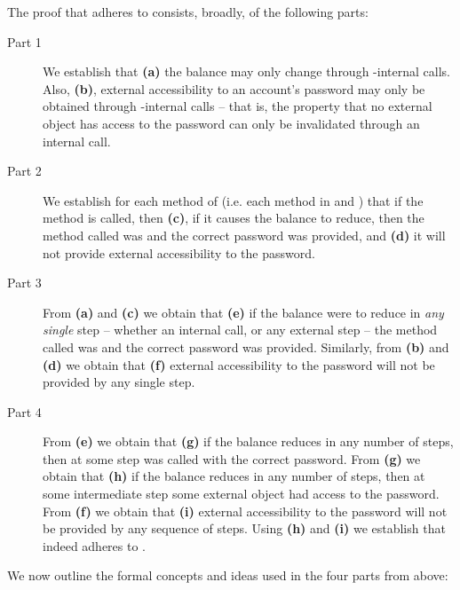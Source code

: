 The proof that  adheres to  consists,
broadly, of the following parts:


\begin{description}
\item[Part 1] We establish that  \textbf{(a)} the balance may only change through  
-internal calls.
Also,  \textbf{(b)},   external accessibility to an account's password may 
only be obtained through  -internal calls -- that is,  the property that
no external object has access to the password can only be invalidated through an internal call.
 
\item[Part 2] We establish  for each method of  (i.e. each method in  and ) that if the method is called, then 
 \textbf{(c)},  if it  causes the  balance to reduce, then the method called was
  and the correct password was provided, and 
  \textbf{(d)} it will not provide external accessibility to the password.

 \item[Part 3]  From \textbf{(a)}  and  \textbf{(c)} we obtain that \textbf{(e)}  if the balance were to 
reduce in \emph{any}  \emph{single} step -- whether an internal call, or any external step --
 the method called was
  and the correct password was provided. Similarly,   from
 \textbf{(b)}  and  \textbf{(d)} we obtain that \textbf{(f)}
 external accessibility to the password will not be provided by any single step.
    
 
\item[Part 4] From \textbf{(e)} we obtain that  \textbf{(g)}   if the balance reduces in any 
number of steps, then at some step   was called with   the correct password.
From  \textbf{(g)}  we obtain that \textbf{(h)} if the balance reduces in any 
number of steps, then at some intermediate step some external object had access to the password.
From \textbf{(f)} we obtain that  \textbf{(i)}  external accessibility to the password will not be provided by any sequence of steps.
Using  \textbf{(h)} and  \textbf{(i)}  we establish that
  indeed adheres to .

\end{description} 
 
\noindent
We  now outline  the  formal concepts and ideas used in the four parts   from above:

